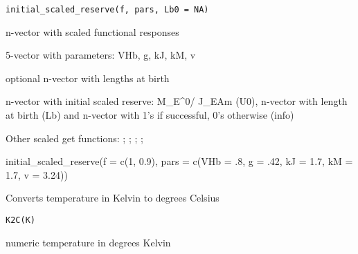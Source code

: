 \documentclass[a4paper]{book}
\begin{document}
%
\begin{Usage}
\begin{verbatim}
initial_scaled_reserve(f, pars, Lb0 = NA)
\end{verbatim}
\end{Usage}
%
\begin{Arguments}
\begin{ldescription}
\item[\code{f}] n-vector with scaled functional responses

\item[\code{pars}] 5-vector with parameters: VHb, g, kJ, kM, v

\item[\code{Lb0}] optional n-vector with lengths at birth
\end{ldescription}
\end{Arguments}
%
\begin{Value}
n-vector with initial scaled reserve: M\_E\textasciicircum{}0/ J\_EAm (U0), n-vector with length at birth (Lb) and n-vector with 1's if successful, 0's otherwise (info)
\end{Value}
%
\begin{SeeAlso}\relax
Other scaled get functions: ;
; ;
; 
\end{SeeAlso}
%
\begin{Examples}
\begin{ExampleCode}
initial_scaled_reserve(f = c(1, 0.9), pars = c(VHb = .8, g = .42, kJ = 1.7, kM = 1.7, v = 3.24))
\end{ExampleCode}
\end{Examples}
%
\begin{Description}\relax
Converts temperature in Kelvin to degrees Celsius
\end{Description}
%
\begin{Usage}
\begin{verbatim}
K2C(K)
\end{verbatim}
\end{Usage}
%
\begin{Arguments}
\begin{ldescription}
\item[\code{K}] numeric temperature in degrees Kelvin
\end{ldescription}
\end{Arguments}
\end{document}
